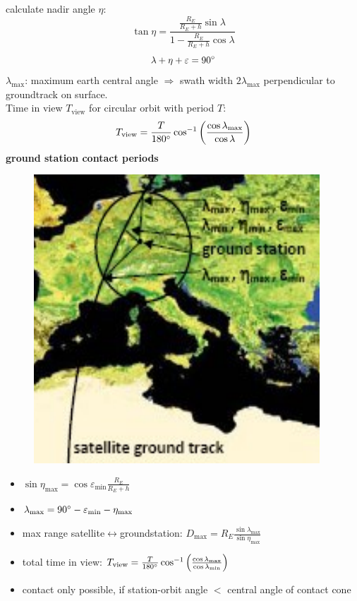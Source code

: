 \documentclass[a4paper,10pt]{article}
\newcommand{\f}{\textbf}
\begin{document}
calculate nadir angle $\eta$:
\[ \tan \eta = \frac{\frac{R_E}{R_E+h}\sin \lambda}{1-\frac{R_E}{R_E+h}\cos\lambda}\]
\[ \lambda + \eta + \varepsilon = 90\degree \]
$\lambda_\text{max}$: maximum earth central angle $\Rightarrow$ swath width $2\lambda_\text{max}$ perpendicular to groundtrack on surface.\\
Time in view $T_\text{view}$ for circular orbit with period $T$:
\[ T_\text{view} = \frac{T}{180\degree}\cos^{-1}\left(\frac{\cos \lambda_\text{max}}{\cos \lambda}\right)\]
\f{ground station contact periods}
\begin{figure}[!ht]
 \centering
 \includegraphics[scale=0.6]{groundtrack}
\end{figure}
\begin{itemize}
 \item $\sin\eta_\text{max} = \cos \varepsilon_\text{min}\frac{R_E}{R_E+h}$
 \item $\lambda_\text{max} = 90\degree - \varepsilon_\text{min} -\eta_\text{max}$
 \item max range satellite$\leftrightarrow$groundstation: $D_\text{max} = R_E\frac{\sin\lambda_\text{max}}{\sin\eta_\text{max}}$
 \item total time in view: $ T_\text{view} = \frac{T}{180\degree}\cos^{-1}\left(\frac{\cos \lambda_\text{max}}{\cos \lambda_\text{min}}\right)$
 \item contact only possible, if station-orbit angle $<$ central angle of contact cone
\end{itemize}
\section{}
\end{document}
